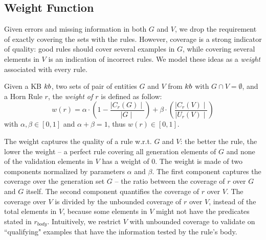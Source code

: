 \vspace{-1ex}	
\subsection{Weight Function} \label{sec:krd_weight_fun}
\vspace{-0.2ex}	
Given errors and missing information in both $G$ and $V$, we drop the requirement of exactly covering the sets with the rules. However, coverage is a strong indicator of quality: good rules should cover several examples in $G$, while covering several elements in $V$ is an indication of incorrect rules.
We model these ideas as a \emph{weight} associated with every rule. %


\begin{definition}
\label{def:cost}
	Given a KB ${\sc kb}$, two sets of pair of entities $G$ and $V$ from ${\sc kb}$ with $G \cap V = \emptyset$, and a Horn Rule $r$, the {\em weight of $r$} is defined as follow:
	\begin{equation} \label{eq:weight_fun}
		w(r) = \alpha \cdot (1-\frac{\mid C_{r}(G)\mid}{\mid G \mid}) +\beta \cdot (\frac{\mid C_{r}(V) \mid}{\mid U_{r}(V)\mid})
	\end{equation}
	with $\alpha,\beta \in [0,1]$ and $\alpha + \beta = 1$, thus $w(r) \in [0,1]$. 
\end{definition}

The weight 
captures the quality of a rule w.r.t. $G$ and $V$: the better the rule, the lower the weight -- a perfect rule covering all generation elements of $G$ and none of the validation elements in $V$ has a weight of $0$.
%
The weight is made of two components normalized by parameters $\alpha$ and $\beta$.
The first component captures the coverage over the generation set $G$ -- the ratio between the coverage of $r$ over $G$ and $G$ itself.
The second component quantifies the coverage of $r$ over $V$. The coverage over $V$ is divided by the unbounded coverage of $r$ over $V$, instead of the total elements in $V$, 
because some elements in $V$ might not have the predicates stated in $r_{body}$.
Intuitively, we restrict $V$ with unbounded coverage to validate on ``qualifying" examples that have the information tested by the rule's body.

